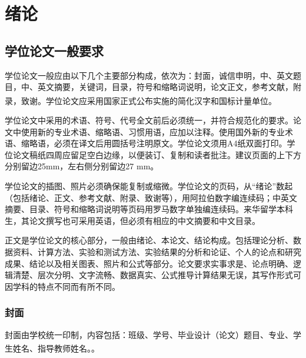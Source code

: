 \documentclass{bucthesis}
\begin{document}
\startmain
\chapter{绪论}
\section{学位论文一般要求}{\par
	学位论文一般应由以下几个主要部分构成，依次为：封面，诚信申明，中、英文题目，中、英文摘要，关键词，目录，符号和缩略词说明，论文正文，参考文献，附录，致谢\textsuperscript{\cite{zjsw}}。学位论文应采用国家正式公布实施的简化汉字和国标计量单位。\par
	学位论文中采用的术语、符号、代号全文前后必须统一，并符合规范化的要求。论文中使用新的专业术语、缩略语、习惯用语，应加以注释。使用国外新的专业术语、缩略语，必须在译文后用圆括号注明原文。学位论文须用A4纸双面打印。学位论文稿纸四周应留足空白边缘，以便装订、复制和读者批注。建议页面的上下方分别留边25mm，左右侧分别留边27 mm。\par
	学位论文的插图、照片必须确保能复制或缩微。学位论文的页码，从“绪论”数起（包括绪论、正文、参考文献、附录、致谢等），用阿拉伯数字编连续码；中英文摘要、目录、符号和缩略词说明等页码用罗马数字单独编连续码。来华留学本科生，其论文撰写也可采用英语，但必须有相应的中文摘要和中文目录。\par	
	正文是学位论文的核心部分，一般由绪论、本论文、结论构成。包括理论分析、数据资料、计算方法、实验和测试方法、实验结果的分析和论证、个人的论点和研究成果、结论以及相关图表、照片和公式等部分。论文要求实事求是、论点明确、逻辑清楚、层次分明、文字流畅、数据真实、公式推导计算结果无误，其写作形式可因学科的特点不同而有所不同。\par}
\subsection{封面}{\par
	封面由学校统一印制，内容包括：班级、学号、毕业设计（论文）题目、专业、学生姓名、指导教师姓名。\textsuperscript{\cite{zjsw}}。\par}
\end{document}

